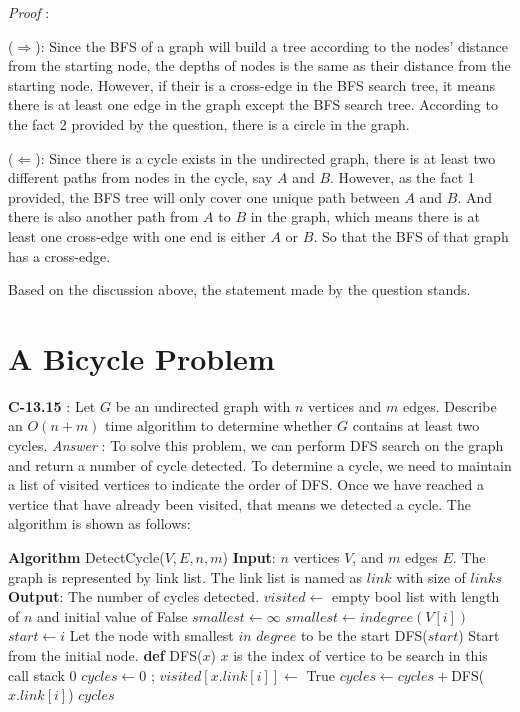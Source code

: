 \documentclass[11pt]{article}
\begin{document}
\noindent\emph{Proof} : 

($\Longrightarrow$): Since the BFS of a graph will build a tree according to the nodes' distance from the starting node, the depths of nodes is the same as their distance from the starting node. However, if their is a cross-edge in the BFS search tree, it means there is at least one edge in the graph except the BFS search tree. According to the fact 2 provided by the question, there is a circle in the graph.

($\Longleftarrow$): Since there is a cycle exists in the undirected graph, there is at least two different paths from nodes in the cycle, say $A$ and $B$. However, as the fact 1 provided, the BFS tree will only cover one unique path between $A$ and $B$. And there is also another path from $A$ to $B$ in the graph, which means there is at least one cross-edge with one end is either $A$ or $B$. So that the BFS of that graph has a cross-edge.

Based on the discussion above, the statement made by the question stands.

\section{A Bicycle Problem}
\textbf{C-13.15} : Let $G$ be an undirected graph with $n$ vertices and $m$ edges. Describe an $O(n+m)$ time algorithm to determine whether $G$ contains at least two cycles.
\noindent\emph{Answer} : To solve this problem, we can perform DFS search on the graph and return a number of cycle detected. To determine a cycle, we need to maintain a list of visited vertices to indicate the order of DFS. Once we have reached a vertice that have already been visited, that means we detected a cycle. The algorithm is shown as follows:
\begin{algorithmic}
	\State \textbf{Algorithm} DetectCycle($V,E,n,m$)
	\State \textbf{Input}: $n$ vertices $V$, and $m$ edges $E$. The graph is represented by link list. The link list is named as $link$ with size of $links$
	\State \textbf{Output}: The number of cycles detected.
	\State 
	\State $visited\gets$ empty bool list with length of $n$ and initial value of False
	\State $smallest\gets \infty$
			\State $smallest\gets indegree(V[i])$
			\State $start\gets i$ \Comment Let the node with smallest $in$ $degree$ to be the start
		\EndIf
	\EndFor
	\State \Return DFS($start$) \Comment Start from the initial node.
	\State 
	\State \textbf{def} DFS($x$) \Comment $x$ is the index of vertice to be search in this call stack
	\State \Return $0$
	\Else
	\State $cycles\gets0$
	\State{};
	\Else
	\State $visited[x.link[i]]\gets$ True 
	\State $cycles\gets cycles +$DFS($x.link[i]$)
	\EndIf
	\EndFor
	\State \Return $cycles$
	\EndIf
\end{algorithmic}
\end{document}
